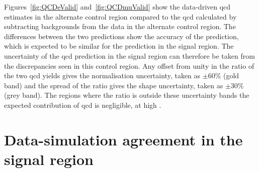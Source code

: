 Figures~\ref{fig:QCDeValid} and~\ref{fig:QCDmuValid} show the data-driven \acrshort{qcd} estimates in the alternate control region compared to the \acrshort{qcd} calculated by subtracting backgrounds from the data in the alternate control region.
The differences between the two predictions show the accuracy of the prediction, which is expected to be similar for the prediction in the signal region.
The uncertainty of the \acrshort{qcd} prediction in the signal region can therefore be taken from the discrepancies seen in this control region.
Any offset from unity in the ratio of the two \acrshort{qcd} yields gives the normalisation uncertainty, taken as $\pm60\%$ (gold band) and the spread of the ratio gives the shape uncertainty, taken as $\pm30\%$ (grey band).
The regions where the ratio is outside these uncertainty bands the expected contribution of \acrshort{qcd} is negligible, \eg{} at high \ptmiss{}.



\newpage
\section{Data-simulation agreement in the signal region} %

